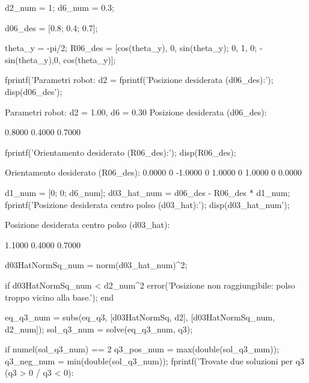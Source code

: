 \documentclass[11pt, a4paper]{article}
\begin{document}
\begin{matlabcode}
d2_num = 1;      %
d6_num = 0.3;    %

d06_des = [0.8; 0.4; 0.7];

theta_y = -pi/2;
R06_des = [cos(theta_y), 0, sin(theta_y);
           0,            1, 0;
           -sin(theta_y),0, cos(theta_y)];

fprintf('Parametri robot: d2 = %
fprintf('Posizione desiderata (d06_des):\n');
disp(d06_des');
\end{matlabcode}
\begin{matlaboutput}
Parametri robot: d2 = 1.00, d6 = 0.30
Posizione desiderata (d06_des):
\end{matlaboutput}
\begin{matlaboutput}
    0.8000    0.4000    0.7000
\end{matlaboutput}
\begin{matlabcode}
fprintf('Orientamento desiderato (R06_des):\n');
disp(R06_des);
\end{matlabcode}
\begin{matlaboutput}
Orientamento desiderato (R06_des):
    0.0000         0   -1.0000
         0    1.0000         0
    1.0000         0    0.0000
\end{matlaboutput}
\begin{matlabcode}

d1_num = [0; 0; d6_num];
d03_hat_num = d06_des - R06_des * d1_num;
fprintf('Posizione desiderata centro polso (d03_hat):\n');
disp(d03_hat_num');
\end{matlabcode}
\begin{matlaboutput}
Posizione desiderata centro polso (d03_hat):
\end{matlaboutput}
\begin{matlaboutput}
    1.1000    0.4000    0.7000
\end{matlaboutput}
\begin{matlabcode}

d03HatNormSq_num = norm(d03_hat_num)^2;

if d03HatNormSq_num < d2_num^2
    error('Posizione non raggiungibile: polso troppo vicino alla base.');
end

eq_q3_num = subs(eq_q3, [d03HatNormSq, d2], [d03HatNormSq_num, d2_num]);
sol_q3_num = solve(eq_q3_num, q3);

if numel(sol_q3_num) == 2
    q3_pos_num = max(double(sol_q3_num));
    q3_neg_num = min(double(sol_q3_num));
    fprintf('Trovate due soluzioni per q3 (q3 > 0 / q3 < 0): %
\end{matlabcode}
\end{document}
